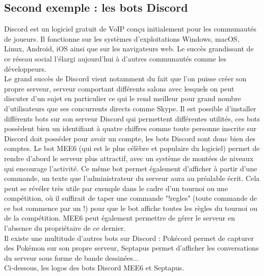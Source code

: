 \documentclass[12pt]{report}
\begin{document}
\newpage
\subsection{Second exemple : les bots Discord}
Discord est un logiciel gratuit de VoIP conçu initialement pour les communautés de joueurs. Il fonctionne sur les systèmes d’exploitations Windows, macOS, Linux, Android, iOS ainsi que sur les navigateurs web. Le succès grandissant de ce réseau social l'élargi aujourd'hui à d'autres communautés comme les développeurs. \\ 

Le grand succès de Discord vient notamment du fait que l'on puisse créer son propre serveur, serveur comportant différents salons avec lesquels on peut discuter d'un sujet en particulier ce qui le rend meilleur pour grand nombre d'utilisateurs que ses concurrents directs comme Skype. Il est possible d'installer différents bots sur son serveur Discord qui permettent différentes utilités, ces bots possèdent bien un identifiant à quatre chiffres comme toute personne inscrite sur Discord doit posséder pour avoir un compte, les bots Discord sont donc bien des comptes. Le bot MEE6 (qui est le plus célèbre et populaire du logiciel) permet de rendre d'abord le serveur plus attractif, avec un système de montées de niveaux qui encourage l'activité. Ce même bot permet également d'afficher à partir d'une commande, un texte que l'administrateur du serveur aura au préalable écrit. Cela peut se révéler très utile par exemple dans le cadre d'un tournoi ou une compétition, où il suffirait de taper une commande "!regles" (toute commande de ce bot commence par un !) pour que le bot affiche toutes les règles du tournoi ou de la compétition. MEE6 peut également permettre de gérer le serveur en l'absence du propriétaire de ce dernier. \\

Il existe une multitude d'autres bots sur Discord : Pokécord permet de capturer des Pokémon sur son propre serveur, Septapus permet d'afficher les conversations du serveur sous forme de bande dessinées... \\

Ci-dessous, les logos des bots Discord MEE6 et Septapus. 
\end{document}
